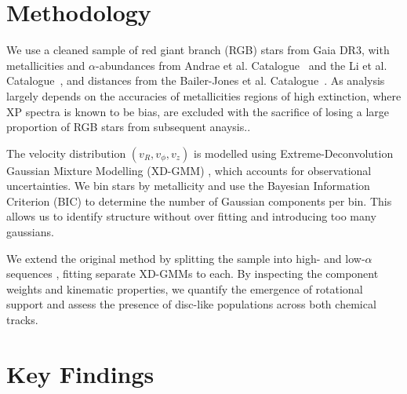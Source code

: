 \documentclass[a4paper,10pt]{article}
\begin{document}
\begin{multicols}{2}
\section*{Methodology}

We use a cleaned sample of red giant branch (RGB) stars from Gaia DR3, with metallicities and $\alpha$-abundances from Andrae et 
al. Catalogue~\cite{Andrae2023} and the Li et al. Catalogue~\cite{Li2024}, and distances from the Bailer-Jones et al. 
Catalogue~\cite{BailerJones2021}. As analysis largely depends on the accuracies of metallicities regions of high extinction, 
where XP spectra is known to be bias, are excluded with the sacrifice of losing a large proportion of RGB stars from subsequent anaysis..

The velocity distribution $(v_R, v_\phi, v_z)$ is modelled using Extreme-Deconvolution Gaussian Mixture Modelling (XD-GMM) \cite{Bovy2011}\cite{pygmmis}, 
which accounts for observational uncertainties. We bin stars by metallicity and use the Bayesian Information Criterion (BIC) to determine the 
number of Gaussian components per bin. This allows us to identify structure without over fitting and introducing too many gaussians.


We extend the original method by splitting the sample into high- and low-$\alpha$ sequences \citep{Vis2024}, fitting separate 
XD-GMMs to each. By inspecting the component weights and kinematic properties, we quantify the emergence of rotational support 
and assess the presence of disc-like populations across both chemical tracks.

\section*{Key Findings}


\end{multicols}
\end{document}
